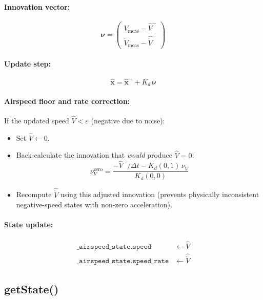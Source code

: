 \documentclass[12pt,a4paper]{article}
\begin{document}
\paragraph{Innovation vector:}
\begin{equation}
  \boldsymbol{\nu} =
  \begin{pmatrix} V_{\text{meas}} - \hat{V}^- \\ \dot{V}_{\text{meas}} - \hat{\dot{V}}^- \end{pmatrix}
\end{equation}

\paragraph{Update step:}
\begin{equation}
  \hat{\mathbf{x}} = \hat{\mathbf{x}}^- + K_d\,\boldsymbol{\nu}
\end{equation}

\paragraph{Airspeed floor and rate correction:}
If the updated speed $\hat{V} < \varepsilon$ (negative due to noise):
\begin{itemize}
  \item Set $\hat{V} \leftarrow 0$.
  \item Back-calculate the innovation that \emph{would} produce $\hat{V} = 0$:
        \begin{equation}
          \nu_V^{\text{zero}} = \frac{-\hat{V}^-/\Delta t - K_d(0,1)\,\nu_{\dot{V}}}{K_d(0,0)}
        \end{equation}
  \item Recompute $\hat{\dot{V}}$ using this adjusted innovation (prevents
        physically inconsistent negative-speed states with non-zero acceleration).
\end{itemize}

\paragraph{State update:}
\begin{align}
  \texttt{\_airspeed\_state.speed}      &\leftarrow \hat{V} \\
  \texttt{\_airspeed\_state.speed\_rate} &\leftarrow \hat{\dot{V}}
\end{align}

\subsection{getState()}
\end{document}
